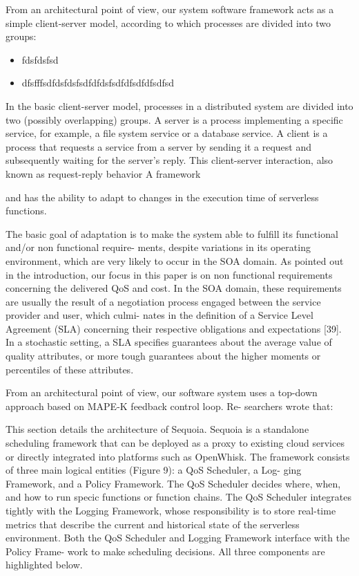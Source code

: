 \documentclass[12pt,a4paper]{report}
\begin{document}
From an architectural point of view, our system software framework acts as a simple client-server model, according to which processes are divided into two groups:

\begin{itemize}
	
	\item fdsfdsfsd
	
	\item dfsfffsdfdsfdsfsdfdfdsfsdfdfsdfdfsdfsd
	
\end{itemize}


In the basic client-server model, processes in a distributed system are divided
into two (possibly overlapping) groups. A server is a process implementing
a specific service, for example, a file system service or a database service. A
client is a process that requests a service from a server by sending it a request
and subsequently waiting for the server’s reply. This client-server interaction,
also known as request-reply behavior 
A framework 




and has the ability to adapt
to changes in the execution time of serverless functions. 



The basic goal of adaptation is to make the system
able to fulfill its functional and/or non functional require-
ments, despite variations in its operating environment,
which are very likely to occur in the SOA domain. As
pointed out in the introduction, our focus in this paper is
on non functional requirements concerning the delivered
QoS and cost. In the SOA domain, these requirements
are usually the result of a negotiation process engaged
between the service provider and user, which culmi-
nates in the definition of a Service Level Agreement (SLA)
concerning their respective obligations and expectations
[39]. In a stochastic setting, a SLA specifies guarantees
about the average value of quality attributes, or more
tough guarantees about the higher moments or percentiles
of these attributes.





From an architectural point of view, our software system uses a top-down approach based on MAPE-K feedback control loop. Re-
searchers wrote that:


This section details the architecture of Sequoia. Sequoia is a
standalone scheduling framework that can be deployed as a
proxy to existing cloud services or directly integrated into
platforms such as OpenWhisk. The framework consists of
three main logical entities (Figure 9): a QoS Scheduler, a Log-
ging Framework, and a Policy Framework. The QoS Scheduler
decides where, when, and how to run specic functions or
function chains. The QoS Scheduler integrates tightly with
the Logging Framework, whose responsibility is to store
real-time metrics that describe the current and historical
state of the serverless environment. Both the QoS Scheduler
and Logging Framework interface with the Policy Frame-
work to make scheduling decisions. All three components
are highlighted below.
\end{document}
